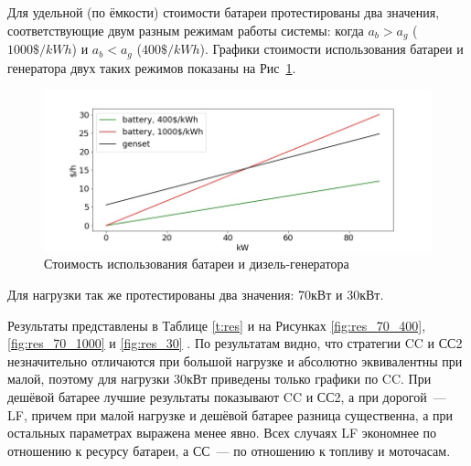 Для удельной (по ёмкости) стоимости батареи протестированы два значения, соответствующие двум разным режимам работы системы: когда $a_b > a_g$ ($1000\$/kWh$) и $a_b < a_g$ ($400\$/kWh$).
Графики стоимости использования батареи и генератора двух таких режимов показаны на Рис~\ref{fig:bgcost}.


\begin{figure}[h]
\includegraphics[scale=0.5]{energy_cost.jpeg}
\caption{Стоимость использования батареи и дизель-генератора}
\centering
\label{fig:bgcost}
\end{figure}

\medskip

Для нагрузки так же протестированы два значения: 70кВт и 30кВт.

Результаты представлены в Таблице \ref{t:res} и на Рисунках \ref{fig:res_70_400}, \ref{fig:res_70_1000} и \ref{fig:res_30} .
По результатам видно, что стратегии CC и СС2 незначительно отличаются при большой нагрузке и абсолютно эквивалентны при малой, поэтому для нагрузки 30кВт приведены только графики по CC. 
При дешёвой батарее лучшие результаты показывают CC и СС2, а при дорогой~--- LF, причем при малой нагрузке и дешёвой батарее разница существенна, а при остальных параметрах выражена менее явно.
Всех случаях LF экономнее по отношению к ресурсу батареи, а СС~--- по отношению к топливу и моточасам.


